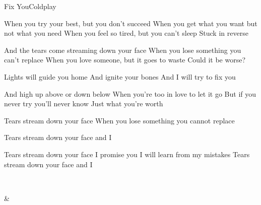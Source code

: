 \begin{Song}{Fix You}{Coldplay}
\begin{multicols}{2}

\begin{Verse}
When you try your best, but you don't succeed
When you get what you want but not what you need
When you feel so tired, but you can't sleep
Stuck in reverse
\espaceInterStrophe

And the tears come streaming down your face
When you lose something you can't replace
When you love someone, but it goes to waste
Could it be worse?
\end{Verse}
\espaceInterStrophe

\begin{Chorus}
Lights will guide you home
And ignite your bones
And I will try to fix you
\end{Chorus}
\espaceInterStrophe

\begin{Verse}
And high up above or down below
When you're too in love to let it go
But if you never try you'll never know
Just what you're worth
\end{Verse}
\espaceInterStrophe

\tochorus
\espaceInterStrophe

\espaceInterStrophe

\begin{Bridge}
Tears stream down your face
When you lose something you cannot replace
\espaceInterStrophe

Tears stream down your face and I
\espaceInterStrophe

Tears stream down your face
I promise you I will learn from my mistakes
Tears stream down your face and I
\end{Bridge}
\espaceInterStrophe

\tochorus

\vfill
~

\end{multicols}

\vfill

\begin{multicols}{2}

\gridGroupNormal

\begin{Chords}[Verse]
\hline
{} & \\\hline
\end{Chords}
\espaceInterGrille


\end{multicols}
\end{Song}
